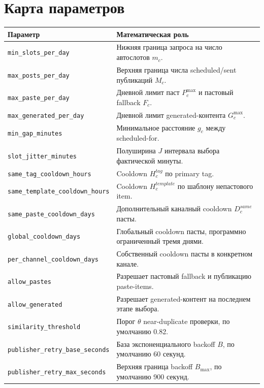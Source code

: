 \documentclass[12pt,a4paper]{article}
\newcommand{\Field}[1]{\texttt{#1}}
\begin{document}
\section{Карта параметров}

\begingroup
\footnotesize
\begin{longtable}{>{\raggedright\arraybackslash}p{}p{}}
\toprule
\textbf{Параметр} & \textbf{Математическая роль} \\
\midrule
\endhead
\Field{min\_slots\_per\_day} & Нижняя граница запроса на число автослотов $m_c$. \\
\Field{max\_posts\_per\_day} & Верхняя граница числа scheduled/sent публикаций $M_c$. \\
\Field{max\_paste\_per\_day} & Дневной лимит паст $P_c^{\max}$ и пастовый fallback $F_c$. \\
\Field{max\_generated\_per\_day} & Дневной лимит generated-контента $G_c^{\max}$. \\
\Field{min\_gap\_minutes} & Минимальное расстояние $g_c$ между scheduled-for. \\
\Field{slot\_jitter\_minutes} & Полуширина $J$ интервала выбора фактической минуты. \\
\Field{same\_tag\_cooldown\_hours} & Cooldown $H_c^{tag}$ по primary tag. \\
\Field{same\_template\_cooldown\_hours} & Cooldown $H_c^{template}$ по шаблону непастового item. \\
\Field{same\_paste\_cooldown\_days} & Дополнительный каналный cooldown $D_c^{same}$ пасты. \\
\Field{global\_cooldown\_days} & Глобальный cooldown пасты, программно ограниченный тремя днями. \\
\Field{per\_channel\_cooldown\_days} & Собственный cooldown пасты в конкретном канале. \\
\Field{allow\_pastes} & Разрешает пастовый fallback и публикацию paste-items. \\
\Field{allow\_generated} & Разрешает generated-контент на последнем этапе выбора. \\
\Field{similarity\_threshold} & Порог $\theta$ near-duplicate проверки, по умолчанию 0.82. \\
\Field{publisher\_retry\_base\_seconds} & База экспоненциального backoff $B$, по умолчанию 60 секунд. \\
\Field{publisher\_retry\_max\_seconds} & Верхняя граница backoff $B_{\max}$, по умолчанию 900 секунд. \\
\bottomrule
\end{longtable}
\endgroup
\end{document}
